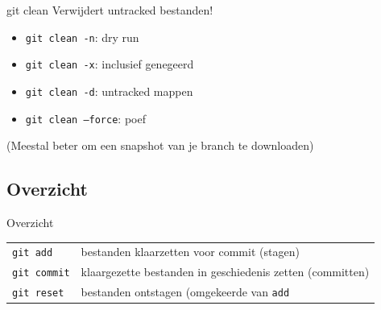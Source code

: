 \begin{frame}{git clean}
	\alert{Verwijdert untracked bestanden!}
	\begin{itemize}
		\item \texttt{git clean -n}: dry run
		\item \texttt{git clean -x}: inclusief genegeerd
		\item \texttt{git clean -d}: untracked mappen
		\item \texttt{git clean --force}: \alert{poef}
	\end{itemize}
	(Meestal beter om een snapshot van je branch te downloaden)
\end{frame}

\subsection{Overzicht}
\begin{frame}{Overzicht}
	{ \footnotesize
	\begin{tabular}{ll}
		\texttt{git add}	& bestanden klaarzetten voor commit (stagen)	\\
		\texttt{git commit} & klaargezette bestanden in geschiedenis zetten (committen)\\
		\texttt{git reset}	& bestanden ontstagen (omgekeerde van \texttt{add}
	\end{tabular}
	}
\end{frame}
